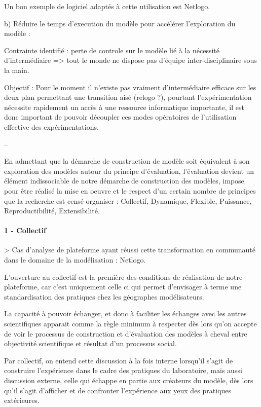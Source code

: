 Un bon exemple de logiciel adaptés à cette utilisation est Netlogo.

b) Réduire le temps d'execution du modèle pour accélérer l'exploration du modèle : 

Contrainte identifié : perte de controle sur le modèle lié à la nécessité d'intermédiaire => tout le monde ne dispose pas d'équipe inter-disciplinaire sous la main.

Objectif : Pour le moment il n'existe pas vraiment d'intermédiaire efficace sur les deux plan permettant une transition aisé (relogo ?), pourtant l'expérimentation nécessite rapidement un accès à une ressource informatique importante, il est donc important de pouvoir découpler ces modes opératoires de l'utilisation effective des expérimentations.

--

En admettant que la démarche de construction de modèle soit équivalent à son exploration des modèles autour du principe d'évaluation, l'évaluation devient un élément indissociable de notre démarche de construction des modèles, impose pour être réalisé la mise en oeuvre et le respect d'un certain nombre de principes que la recherche est censé organiser : Collectif, Dynamique, Flexible, Puissance, Reproductibilité, Extensibilité. 

\paragraph{1 - Collectif}

> Cas d'analyse de plateforme ayant réussi cette transformation en communauté dans le domaine de la modélisation : Netlogo.

L'ouverture au collectif est la première des conditions de réalisation de notre plateforme, car c'est uniquement celle ci qui permet d'envisager à terme une standardisation des pratiques chez les géographes modélisateurs. %

La capacité à pouvoir échanger, et donc à faciliter les échanges avec les autres scientifiques apparait comme la règle minimum à respecter dès lors qu'on accepte de voir le processus de construction et d'évaluation des modèles à cheval entre objectivité scientifique et résultat d'un processus social. 

Par collectif, on entend cette discussion à la fois interne lorsqu'il s'agit de construire l'expérience dans le cadre des pratiques du laboratoire, mais aussi discussion externe, celle qui échappe en partie aux créateurs du modèle, dès lors qu'il s'agit d'afficher et de confronter l'expérience aux yeux des pratiques extérieures.

